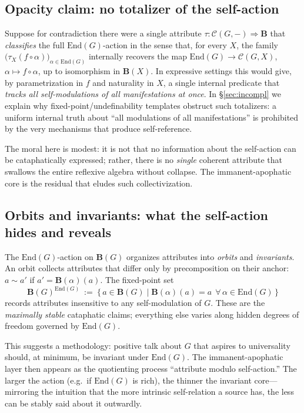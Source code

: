 \documentclass[11pt]{article}
\theoremstyle{upright}
\begin{document}
\subsection{Opacity claim: no totalizer of the self-action}
Suppose for contradiction there were a single attribute \(\tau:\mathcal C(G,-)\Rightarrow \mathbf B\) that \emph{classifies} the full \(\mathrm{End}(G)\)-action in the sense that, for every \(X\), the family \(\big(\tau_X(f\circ \alpha)\big)_{\alpha\in\mathrm{End}(G)}\) internally recovers the map \(\mathrm{End}(G)\to \mathcal C(G,X)\), \(\alpha\mapsto f\circ \alpha\), up to isomorphism in \(\mathbf B(X)\). In expressive settings this would give, by parametrization in \(f\) and naturality in \(X\), a single internal predicate that \emph{tracks all self-modulations of all manifestations at once}. In \S\ref{sec:incompl} we explain why fixed-point/undefinability templates obstruct such totalizers: a uniform internal truth about “all modulations of all manifestations” is prohibited by the very mechanisms that produce self-reference.

The moral here is modest: it is not that no information about the self-action can be cataphatically expressed; rather, there is no \emph{single} coherent attribute that swallows the entire reflexive algebra without collapse. The immanent-apophatic core is the residual that eludes such collectivization.

\subsection{Orbits and invariants: what the self-action hides and reveals}
The \(\mathrm{End}(G)\)-action on \(\mathbf B(G)\) organizes attributes into \emph{orbits} and \emph{invariants}. An orbit collects attributes that differ only by precomposition on their anchor: \(a\sim a'\) if \(a'=\mathbf B(\alpha)(a)\). The fixed-point set
\[
\mathbf B(G)^{\mathrm{End}(G)}\ :=\ \{\,a\in\mathbf B(G)\mid \mathbf B(\alpha)(a)=a\ \ \forall\,\alpha\in\mathrm{End}(G)\,\}
\]
records attributes insensitive to any self-modulation of \(G\). These are the \emph{maximally stable} cataphatic claims; everything else varies along hidden degrees of freedom governed by \(\mathrm{End}(G)\).

This suggests a methodology: positive talk about \(G\) that aspires to universality should, at minimum, be invariant under \(\mathrm{End}(G)\). The immanent-apophatic layer then appears as the quotienting process “attribute modulo self-action.” The larger the action (e.g.\ if \(\mathrm{End}(G)\) is rich), the thinner the invariant core—mirroring the intuition that the more intrinsic self-relation a source has, the less can be stably said about it outwardly.
\end{document}
